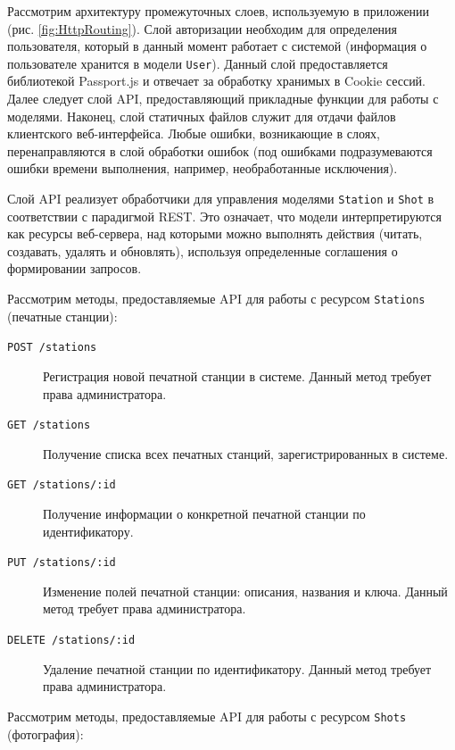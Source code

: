 \documentclass[a4paper,14pt,href]{article}
\begin{document}
Рассмотрим архитектуру промежуточных слоев, используемую в приложении (рис. \ref{fig:HttpRouting}). Слой авторизации
необходим для определения пользователя, который в данный момент работает с системой (информация о пользователе хранится
в модели \texttt{User}). Данный слой предоставляется библиотекой Passport.js и отвечает за обработку хранимых в
Cookie сессий. Далее следует слой API, предоставляющий прикладные функции для работы с моделями. Наконец, слой статичных
файлов служит для отдачи файлов клиентского веб-интерфейса. Любые ошибки, возникающие в слоях, перенаправляются в слой
обработки ошибок (под ошибками подразумеваются ошибки времени выполнения, например, необработанные исключения).

Слой API реализует обработчики для управления моделями \texttt{Station} и \texttt{Shot} в соответствии с парадигмой
REST. Это означает, что модели интерпретируются как ресурсы веб-сервера, над которыми можно выполнять действия (читать,
создавать, удалять и обновлять), используя определенные соглашения о формировании запросов.

Рассмотрим методы, предоставляемые API для работы с ресурсом \texttt{Stations} (печатные станции):

\begin{description}
  \item[\texttt{POST /stations}] Регистрация новой печатной станции в системе. Данный метод требует права администратора.
  \item[\texttt{GET /stations}] Получение списка всех печатных станций, зарегистрированных в системе.
  \item[\texttt{GET /stations/:id}] Получение информации о конкретной печатной станции по идентификатору.
  \item[\texttt{PUT /stations/:id}] Изменение полей печатной станции: описания, названия и ключа. Данный метод требует
    права администратора.
  \item[\texttt{DELETE /stations/:id}] Удаление печатной станции по идентификатору. Данный метод требует права
    администратора.
\end{description}

Рассмотрим методы, предоставляемые API для работы с ресурсом \texttt{Shots} (фотография):
\end{document}
